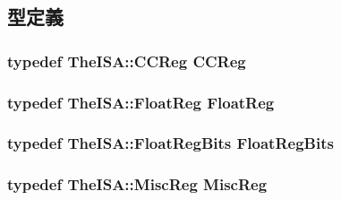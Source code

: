 \subsection{型定義}
\hypertarget{classBaseSimpleCPU_a0c9de550a32808e6a25b54b6c791d5ab}{
\subsubsection[{CCReg}]{\setlength{\rightskip}{0pt plus 5cm}typedef TheISA::CCReg {\bf CCReg}}}
\label{classBaseSimpleCPU_a0c9de550a32808e6a25b54b6c791d5ab}
\hypertarget{classBaseSimpleCPU_a75484259f1855aabc8d74c6eb1cfe186}{
\subsubsection[{FloatReg}]{\setlength{\rightskip}{0pt plus 5cm}typedef TheISA::FloatReg {\bf FloatReg}}}
\label{classBaseSimpleCPU_a75484259f1855aabc8d74c6eb1cfe186}
\hypertarget{classBaseSimpleCPU_aab5eeae86499f9bfe15ef79360eccc64}{
\subsubsection[{FloatRegBits}]{\setlength{\rightskip}{0pt plus 5cm}typedef TheISA::FloatRegBits {\bf FloatRegBits}}}
\label{classBaseSimpleCPU_aab5eeae86499f9bfe15ef79360eccc64}
\hypertarget{classBaseSimpleCPU_aaf5f073a387db0556d1db4bcc45428bc}{
\subsubsection[{MiscReg}]{\setlength{\rightskip}{0pt plus 5cm}typedef TheISA::MiscReg {\bf MiscReg}}}
\label{classBaseSimpleCPU_aaf5f073a387db0556d1db4bcc45428bc}


